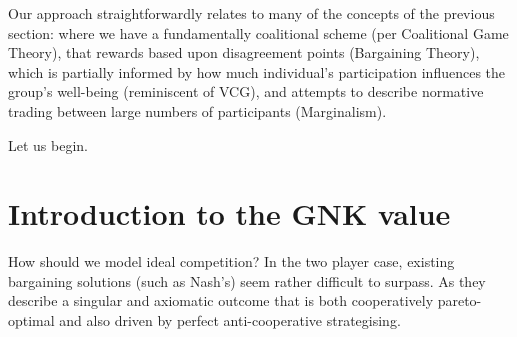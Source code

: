 Our approach straightforwardly relates to many of the concepts of the previous section: where we have a fundamentally coalitional scheme (per Coalitional Game Theory), that rewards based upon disagreement points (Bargaining Theory), which is partially informed by how much individual's participation influences the group's well-being (reminiscent of VCG), and attempts to describe normative trading between large numbers of participants (Marginalism).




Let us begin.

\section{Introduction to the GNK value}

How should we model ideal competition? In the two player case, existing bargaining solutions (such as Nash's) seem rather difficult to surpass. As they describe a singular and axiomatic outcome that is both cooperatively pareto-optimal and also driven by perfect anti-cooperative strategising.

